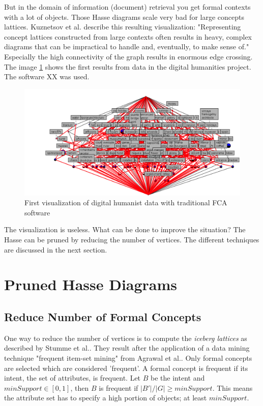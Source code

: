 \documentclass[11pt]{report}
\begin{document}
But in the domain of information (document) retrieval you get formal contexts with a lot of objects. Those Hasse diagrams scale very bad for large concepts lattices. Kuznetsov et al. \cite{Kuznetsov20072}  describe this resulting visualization: "Representing concept lattices constructed from large contexts often results in heavy, complex diagrams that can be impractical to handle and, eventually, to make sense of." Especially the high connectivity of the graph results in enormous edge crossing. The image \ref{figure:firstVisualizaion} shows the first results from data in the digital humanities project. The software XX was used. \\

\begin{figure}[!ht]
	\centering
	\includegraphics[width=\linewidth]{./images/firstVisualization}
\caption{First visualization of digital humanist data with traditional FCA software}
\label{figure:firstVisualizaion}
\end{figure}

The visualization is useless. What can be done to improve the situation? The Hasse can be pruned by reducing the number of vertices. The different techniques are discussed in the next section.

\section{Pruned Hasse Diagrams}

\subsection{Reduce Number of Formal Concepts}

One way to reduce the number of vertices is to compute the \textit{iceberg lattices} as described by Stumme et al.\cite{Stumme2002}. They result after the application of a data mining technique "frequent item-set mining" from Agrawal et al.\cite{Agrawal1993}. Only formal concepts are selected which are considered 'frequent'. A formal concept is frequent if its intent, the set of attributes, is frequent. Let $B$ be the intent and $minSupport \in [0, 1]$, then $B$ is frequent if $ |B'|/|G| \geq minSupport$. This means the attribute set has to specify a high portion of objects; at least $minSupport$. \\
\end{document}

